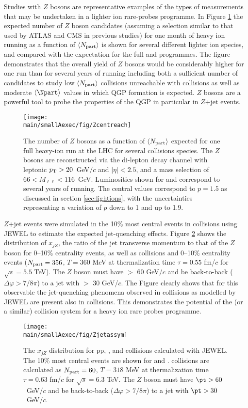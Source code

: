Studies with $Z$ bosons are representative examples of the types of measurements that may be undertaken in a lighter ion rare-probes programme.  In Figure \ref{fig:Zreach} the expected number of $Z$ boson candidates (assuming a selection similar to that used by ATLAS and CMS in previous studies) for one month of heavy ion running  as a function of $\langle N_{\rm part}\rangle$ is shown for several different lighter ion species, and compared with the expectation for the full \PbPb and \pPb programmes.  The figure demonstrates that the overall yield of $Z$ bosons would be considerably higher for one \ArAr run than for several years of \PbPb running including both a sufficient number of candidates to study low $\langle N_{\rm part}\rangle$ collisions unreachable with \PbPb collisions as well as moderate $\langle\Npart\rangle$ values in which QGP formation is expected.  $Z$ bosons are a powerful tool to probe the properties of the QGP in particular in $Z$+jet events.  
\begin{figure}
\centering
\texttt{[image: \\main/smallAexec/fig/Zcentreach]}
\caption{
The number of $Z$ bosons as a function of $\langle N_{\rm part}\rangle$ expected for one full heavy-ion run at the LHC for several collisions species.  The $Z$ bosons are reconstructed via the di-lepton decay channel with leptonic $p\sb{\scriptstyle\mathrm{T}}>20$~GeV$/c$ and $|\eta|<2.5$, and a mass selection of $66<M_{\ell\ell}<116$~GeV.  Luminosities shown for \PbPb and \pPb correspond to several years of running.  The central values correspond to $p=1.5$ as discussed in section \ref{sec:lightions}, with the uncertainties representing a variation of $p$ down to 1 and up to 1.9.
\label{fig:Zreach}}
\end{figure}

$Z$+jet events were simulated in the 10\% most central events in \ArAr collisions using JEWEL \cite{Zapp:2009ud} to estimate the expected jet-quenching effects.  Figure \ref{fig:ArAr_xjz} shows the distribution of $x_{jZ}$, the ratio of the jet transverse momentum to that of the $Z$ boson for 0--10\% centrality \ArAr events, as well as \pp collisions and 0--10\% centrality \PbPb events ($N_{\rm part} = 356$, $T=360$ MeV at thermalization time $\tau = 0.55$ fm/$c$ for $\sqrt{s}=5.5$ TeV).  The $Z$ boson must have \pt $>$ 60 GeV/$c$ and be back-to-back ($\Delta\varphi > 7/8\pi$) to a jet with \pt $>$ 30 GeV/$c$.  The Figure clearly shows that for this observable the jet-quenching phenomena observed in \PbPb collisions as modelled by JEWEL are present also in \ArAr collisions.  This demonstrates the potential of the \ArAr (or a similar) collision system for a heavy ion rare probes programme.%
\begin{figure}
\centering
\texttt{[image: \\main/smallAexec/fig/Zjetassym]}
\caption{
The $x_{jZ}$ distribution for pp, \PbPb, and \ArAr collisions calculated with JEWEL.  The 10\% most central events are shown for \PbPb and \ArAr.  \ArAr collisions are calculated as $N_{\rm part} = 60$, $T=318$ MeV at thermalization time $\tau = 0.63$ fm/$c$ for $\sqrt{s}=6.3$ TeV.  The $Z$ boson must have $\pt > 60$~GeV/$c$ and be back-to-back ($\Delta\varphi > 7/8\pi$) to a jet with $\pt > 30$~GeV/$c$.    
\label{fig:ArAr_xjz}}
\end{figure}